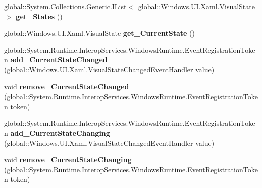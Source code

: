 \begin{DoxyCompactItemize}
\item 
\mbox{\label{interface_windows_1_1_u_i_1_1_xaml_1_1_i_visual_state_group_a40eeb37ab129bd4e82ee51c795415b77}} 
global\+::\+System.\+Collections.\+Generic.\+I\+List$<$ global\+::\+Windows.\+U\+I.\+Xaml.\+Visual\+State $>$ {\bfseries get\+\_\+\+States} ()
\item 
\mbox{\label{interface_windows_1_1_u_i_1_1_xaml_1_1_i_visual_state_group_a2994cf852dde78fbd8e46dfff9698768}} 
global\+::\+Windows.\+U\+I.\+Xaml.\+Visual\+State {\bfseries get\+\_\+\+Current\+State} ()
\item 
\mbox{\label{interface_windows_1_1_u_i_1_1_xaml_1_1_i_visual_state_group_ad6ee000116bc2b2c74786dee0efd418c}} 
global\+::\+System.\+Runtime.\+Interop\+Services.\+Windows\+Runtime.\+Event\+Registration\+Token {\bfseries add\+\_\+\+Current\+State\+Changed} (global\+::\+Windows.\+U\+I.\+Xaml.\+Visual\+State\+Changed\+Event\+Handler value)
\item 
\mbox{\label{interface_windows_1_1_u_i_1_1_xaml_1_1_i_visual_state_group_a851cf8f9cf416f903308f91d9dc794cb}} 
void {\bfseries remove\+\_\+\+Current\+State\+Changed} (global\+::\+System.\+Runtime.\+Interop\+Services.\+Windows\+Runtime.\+Event\+Registration\+Token token)
\item 
\mbox{\label{interface_windows_1_1_u_i_1_1_xaml_1_1_i_visual_state_group_a15af6808561ea3eb12afb9f3dc76cfb7}} 
global\+::\+System.\+Runtime.\+Interop\+Services.\+Windows\+Runtime.\+Event\+Registration\+Token {\bfseries add\+\_\+\+Current\+State\+Changing} (global\+::\+Windows.\+U\+I.\+Xaml.\+Visual\+State\+Changed\+Event\+Handler value)
\item 
\mbox{\label{interface_windows_1_1_u_i_1_1_xaml_1_1_i_visual_state_group_ac006c519047c6976b91b945fef41af29}} 
void {\bfseries remove\+\_\+\+Current\+State\+Changing} (global\+::\+System.\+Runtime.\+Interop\+Services.\+Windows\+Runtime.\+Event\+Registration\+Token token)
\item 

\end{DoxyCompactItemize}
